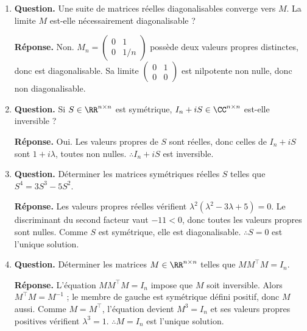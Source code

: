 \documentclass[12pt, a4paper]{article}
\begin{document}
\begin{enumerate}[label=9.\arabic*., start=94]
  \item \begin{minipage}[t]{\linewidth}\raggedright
\textbf{Question.} Une suite de matrices réelles diagonalisables converge vers $M$. La limite $M$ est-elle nécessairement diagonalisable ?
\par\smallskip
\textbf{Réponse.} Non. $M_n=\begin{pmatrix}0&1\\0&1/n\end{pmatrix}$ possède deux valeurs propres distinctes, donc est diagonalisable.
    Sa limite $\begin{pmatrix}0&1\\0&0\end{pmatrix}$ est nilpotente non nulle, donc non diagonalisable.
\end{minipage}

  \item \begin{minipage}[t]{\linewidth}\raggedright
\textbf{Question.} Si $S\in\RR^{n\times n}$ est symétrique, $I_n+iS\in\CC^{n\times n}$ est-elle inversible ?
\par\smallskip
\textbf{Réponse.} Oui. Les valeurs propres de $S$ sont réelles, donc celles de $I_n+iS$ sont $1+i\lambda$, toutes non nulles.
    $\therefore I_n+iS$ est inversible.
\end{minipage}

  \item \begin{minipage}[t]{\linewidth}\raggedright
\textbf{Question.} Déterminer les matrices symétriques réelles $S$ telles que $S^4=3S^3-5S^2$.
\par\smallskip
\textbf{Réponse.} Les valeurs propres réelles vérifient $\lambda^2(\lambda^2-3\lambda+5)=0$.
    Le discriminant du second facteur vaut $-11<0$, donc toutes les valeurs propres sont nulles.
    Comme $S$ est symétrique, elle est diagonalisable.
    $\therefore S=0$ est l'unique solution.
\end{minipage}

  \item \begin{minipage}[t]{\linewidth}\raggedright
\textbf{Question.} Déterminer les matrices $M\in\RR^{n\times n}$ telles que $MM^\top M=I_n$.
\par\smallskip
\textbf{Réponse.} L'équation $MM^\top M=I_n$ impose que $M$ soit inversible.
    Alors $M^\top M=M^{-1}$ ; le membre de gauche est symétrique défini positif, donc $M$ aussi.
    Comme $M=M^\top$, l'équation devient $M^3=I_n$ et ses valeurs propres positives vérifient $\lambda^3=1$.
    $\therefore M=I_n$ est l'unique solution.
\end{minipage}


\end{enumerate}
\end{document}
